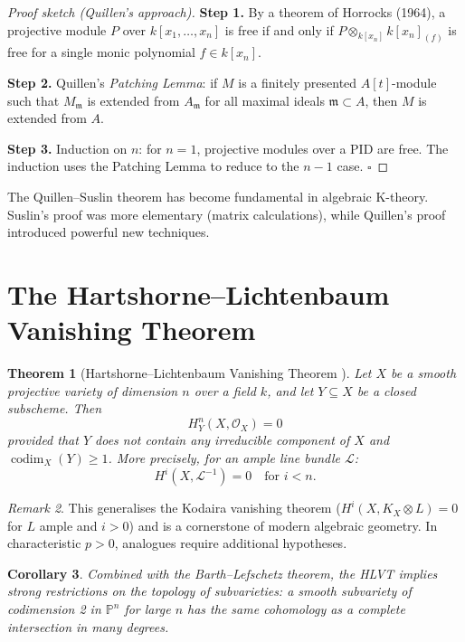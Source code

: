 \documentclass[12pt,a4paper]{amsart}
\newtheorem{theorem}{Theorem}[section]
\newtheorem{corollary}[theorem]{Corollary}
\theoremstyle{definition}
\theoremstyle{remark}
\newtheorem{remark}[theorem]{Remark}
\DeclareMathOperator{\codim}{codim}
\newcommand{\PP}{\mathbb{P}}
\newcommand{\OO}{\mathcal{O}}
\begin{document}
\begin{proof}[Proof sketch (Quillen's approach)]
\textbf{Step 1.}  By a theorem of Horrocks (1964), a projective module $P$
over $k[x_1,\ldots,x_n]$ is free if and only if $P \otimes_{k[x_n]} k[x_n]_{(f)}$
is free for a single monic polynomial $f \in k[x_n]$.

\textbf{Step 2.}  Quillen's \emph{Patching Lemma}: if $M$ is a finitely
presented $A[t]$-module such that $M_\mathfrak{m}$ is extended from
$A_\mathfrak{m}$ for all maximal ideals $\mathfrak{m} \subset A$, then $M$
is extended from $A$.

\textbf{Step 3.}  Induction on $n$: for $n=1$, projective modules over a
PID are free.  The induction uses the Patching Lemma to reduce to the
$n-1$ case. $\square$
\end{proof}

The Quillen--Suslin theorem has become fundamental in algebraic K-theory.
Suslin's proof was more elementary (matrix calculations), while Quillen's
proof introduced powerful new techniques.

\section{The Hartshorne--Lichtenbaum Vanishing Theorem}

\begin{theorem}[Hartshorne--Lichtenbaum Vanishing Theorem \cite{Hartshorne1968}]
\label{thm:HLVT}
Let $X$ be a smooth projective variety of dimension $n$ over a field $k$,
and let $Y \subseteq X$ be a closed subscheme.  Then
\[
  H^n_Y(X, \OO_X) = 0
\]
provided that $Y$ does not contain any irreducible component of $X$ and
$\codim_X(Y) \ge 1$.  More precisely, for an ample line bundle $\mathcal{L}$:
\[
  H^i(X, \mathcal{L}^{-1}) = 0 \quad \text{for } i < n.
\]
\end{theorem}

\begin{remark}
This generalises the Kodaira vanishing theorem ($H^i(X, K_X \otimes L) = 0$
for $L$ ample and $i > 0$) and is a cornerstone of modern algebraic geometry.
In characteristic $p > 0$, analogues require additional hypotheses.
\end{remark}

\begin{corollary}
Combined with the Barth--Lefschetz theorem, the HLVT implies strong
restrictions on the topology of subvarieties: a smooth subvariety of
codimension 2 in $\PP^n$ for large $n$ has the same cohomology as a
complete intersection in many degrees.
\end{corollary}
\end{document}
